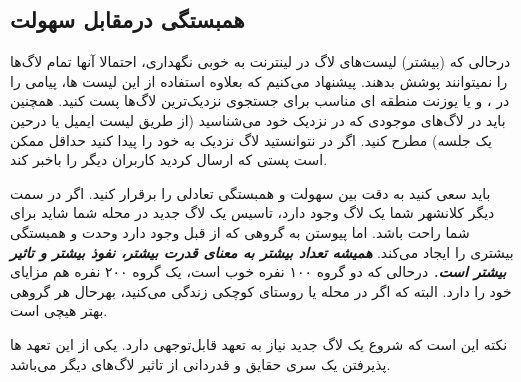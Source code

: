 \subsection{همبستگی درمقابل سهولت}

درحالی که (بیشتر) لیست‌های لاگ در لینترنت  به خوبی نگهداری،
احتمالا آنها تمام لاگ‌ها را نمیتوانند پوشش بدهند. پیشنهاد می‌کنیم
که بعلاوه استفاده از این لیست ها، پیامی را در 
،
و یا یوزنت منطقه ای مناسب برای جستجوی نزدیک‌ترین لاگ‌ها پست کنید.
همچنین باید در لاگ‌های موجودی که در نزدیک خود می‌شناسید
(از طریق لیست ایمیل یا درحین یک جلسه) مطرح کنید.
اگر در نتوانستید لاگ نزدیک به خود را پیدا کنید حداقل ممکن است
پستی که ارسال کردید کاربران دیگر را باخبر کند.


باید سعی کنید به دقت بین سهولت و همبستگی تعادلی را برقرار کنید.
اگر در سمت دیگر کلانشهر شما یک لاگ وجود دارد، تاسیس یک لاگ جدید
در محله شما شاید برای شما راحت باشد. اما پیوستن به گروهی که از قبل
وجود دارد وحدت و همبستگی بیشتری را ایجاد می‌کند.
{\bfseries {\itshape
همیشه تعداد بیشتر به معنای قدرت بیشتر، نفوذ بیشتر و تاثیر بیشتر است.
}}
درحالی که دو گروه ۱۰۰ نفره خوب است، یک گروه ۲۰۰ نفره هم مزایای خود را دارد.
البته که اگر در محله یا روستای کوچکی زندگی می‌کنید، بهرحال هر گروهی بهتر هیچی است.

نکته این است که شروع یک لاگ جدید نیاز به تعهد قابل‌توجهی دارد.
یکی از این تعهد ها پذیرفتن یک سری حقایق و قدردانی از تاثیر لاگ‌های
دیگر می‌باشد.
